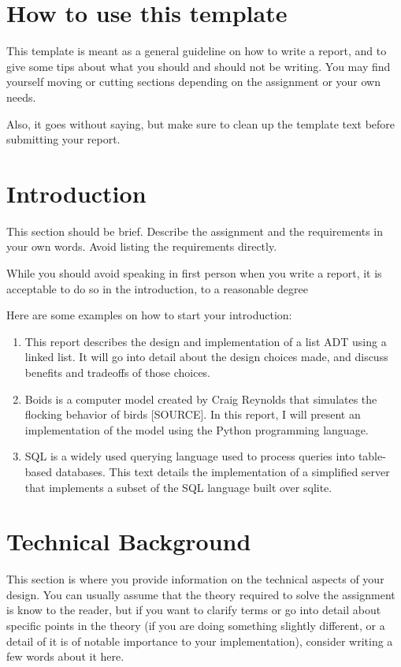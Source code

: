 \begin{flushleft}
\setcounter{page}{1}
\section[How to use this template]{How to use this template}
This template is meant as a general guideline on how to write a report, and to give some tips about what you should and should not be writing. You may find yourself moving or cutting sections depending on the assignment or your own needs.


\bigskip

Also, it goes without saying, but make sure to clean up the template text before submitting your report. 

\section{Introduction}
This section should be brief. Describe the assignment and the requirements in your own words. Avoid listing the requirements directly.


\bigskip

While you should avoid speaking in first person when you write a report, it is acceptable to do so in the introduction, to a reasonable degree


\bigskip

Here are some examples on how to start your introduction:

\begin{enumerate}
\item This report describes the design and implementation of a list ADT using a linked list. It will go into detail about the design choices made, and discuss benefits and tradeoffs of those choices.
\item Boids is a computer model created by Craig Reynolds that simulates the flocking behavior of birds [SOURCE]. In this report, I will present an implementation of the model using the Python programming language.
\item SQL is a widely used querying language used to process queries into table-based databases. This text details the implementation of a simplified server that implements a subset of the SQL language built over sqlite.
\end{enumerate}
\section{Technical Background}
This section is where you provide information on the technical aspects of your design. You can usually assume that the theory required to solve the assignment is know to the reader, but if you want to clarify terms or go into detail about specific points in the theory (if you are doing something slightly different, or a detail of it is of notable importance to your implementation), consider writing a few words about it here. 


\end{flushleft}
